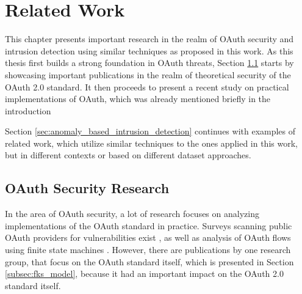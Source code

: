 \documentclass[
    fontsize=12pt,
    headings=small,
    parskip=half,           %
    bibliography=totoc,
    numbers=noenddot,       %
    open=any,               %
    ]{scrreprt}
\begin{document}
\chapter{Related Work}
\label{chap:related_work}
This chapter presents important research in the realm of OAuth security and intrusion detection using similar techniques as proposed in this work. As this thesis first builds a strong foundation in OAuth threats, Section \ref{sec:oauth_security_research} starts by showcasing important publications in the realm of theoretical security of the OAuth 2.0 standard. It then proceeds to present a recent study on practical implementations of OAuth, which was already mentioned briefly in the introduction

Section \ref{sec:anomaly_based_intrusion_detection} continues with examples of related work, which utilize similar techniques to the ones applied in this work, but in different contexts or based on different dataset approaches.

\section{OAuth Security Research}
\label{sec:oauth_security_research}
In the area of OAuth security, a lot of research focuses on analyzing implementations of the OAuth standard in practice. Surveys scanning public OAuth providers for vulnerabilities exist \cite{philippaerts2022oauch}, as well as analysis of OAuth flows using finite state machines \cite{munonye2022machine}. However, there are publications by one research group, that focus on the OAuth standard itself, which is presented in  Section \ref{subsec:fks_model}, because it had an important impact on the OAuth 2.0 standard itself.
\end{document}
